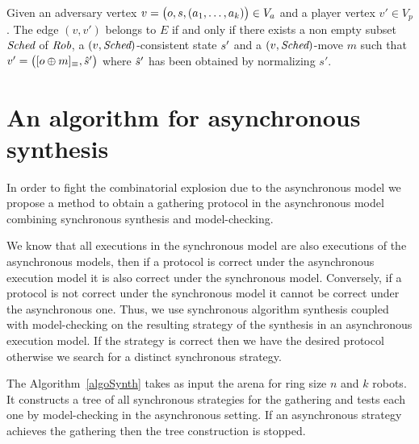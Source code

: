 
Given an adversary vertex $v = \bigl (o, s, (a_1, \dots, a_k)\bigr ) \in V_a$ and a player vertex $v' \in V_p$.
The edge $(v, v')$ belongs to $E$ if and only if there exists a non empty 
 subset $\textit{Sched}$ of $\textit{Rob}$, a $(v, \textit{Sched})$-consistent state $s'$ and 
 a $(v, \textit{Sched})$-move $m$ such that $v'=\bigl ([o\oplus m]_{\equiv}, \hat{s}' \bigr )$
 where $\hat{s}'$ has been obtained by normalizing $s'$.


		\section {An algorithm for asynchronous synthesis}
In order to fight the combinatorial explosion due to the asynchronous model
we propose a method to obtain a gathering protocol in the asynchronous model 
combining synchronous synthesis and model-checking. 

We know that all executions in the synchronous model are also executions of the 
asynchronous models, then if a protocol is correct under the asynchronous 
execution model it is also correct under the synchronous model. Conversely, if a
protocol is not correct under the synchronous model it cannot be correct under 
the asynchronous one.
Thus, we use synchronous algorithm synthesis coupled with model-checking 
on the resulting strategy of the synthesis in an asynchronous execution model. 
If the strategy is correct then we have the desired protocol
 otherwise we search for a distinct synchronous strategy.
 
The Algorithm~\ref{algoSynth} takes as input the arena for ring size $n$ and $k$ robots. 
It constructs a tree of all synchronous strategies for the gathering and tests each one by model-checking in the asynchronous setting.
If an asynchronous strategy achieves the gathering then the tree construction is stopped.
 
